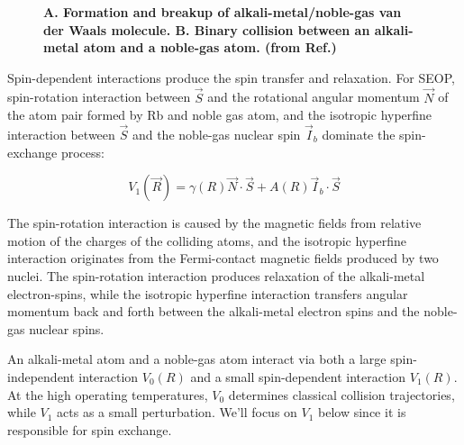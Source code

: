 \begin{figure}[t!]
	\centering
	\caption{{\bf A. Formation and breakup of alkali-metal/noble-gas van der Waals molecule. B. Binary collision between an alkali-metal atom and a noble-gas atom. (from Ref.\@ \cite{WalkerHapper})}}
	\label{SpinExchange}
\end{figure}

Spin-dependent interactions produce the spin transfer and relaxation. For SEOP, spin-rotation interaction between $\vec{S}$ and the rotational angular momentum $\vec{N}$ of the atom pair formed by Rb and noble gas atom, and the isotropic hyperfine interaction between $\vec{S}$ and the noble-gas nuclear spin $\vec{I}_{b}$ dominate the spin-exchange process:

\begin{equation}\label{V1}
V_{1}(\vec{R})=\gamma(R)\vec{N}\cdot \vec{S}+A(R)\vec{I}_{b}\cdot \vec{S}
\end{equation}

The spin-rotation interaction is caused by the magnetic fields from relative motion of the charges of the colliding atoms, and the isotropic hyperfine interaction originates from the Fermi-contact magnetic fields produced by two nuclei. The spin-rotation interaction produces relaxation of the alkali-metal electron-spins, while the isotropic hyperfine interaction transfers angular momentum back and forth between the alkali-metal electron spins and the noble-gas nuclear spins.

An alkali-metal atom and a noble-gas atom interact via both a large spin-independent interaction $V_{0}(R)$ and a small spin-dependent interaction $V_{1}(R)$. At the high operating temperatures, $V_{0}$ determines classical collision trajectories, while $V_{1}$ acts as a small perturbation. We'll focus on $V_{1}$ below since it is responsible for spin exchange.

